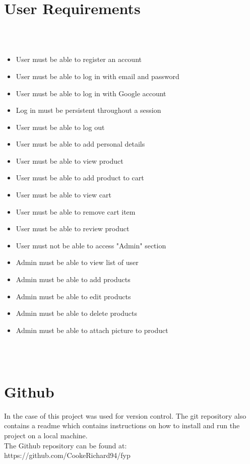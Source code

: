 \section{User Requirements} \\ \\
\begin{itemize}
	\item User must be able to register an account
	\item User must be able to log in with email and password
	\item User must be able to log in with Google account
	\item Log in must be persistent throughout a session
	\item User must be able to log out
	\item User must be able to add personal details
	\item User must be able to view product
	\item User must be able to add product to cart
	\item User must be able to view cart
	\item User must be able to remove cart item
	\item User must be able to review product
	\item User must not be able to access "Admin" section
	\item Admin must be able to view list of user
	\item Admin must be able to add products
	\item Admin must be able to edit products
	\item Admin must be able to delete products
	\item Admin must be able to attach picture to product
\end{itemize} \\ \\

\section{Github} 
In the case of this project was used for version control. The git repository also contains a readme which contains instructions on how to install and run the project on a local machine. \\
The Github repository can be found at: \\
https://github.com/CookeRichard94/fyp
